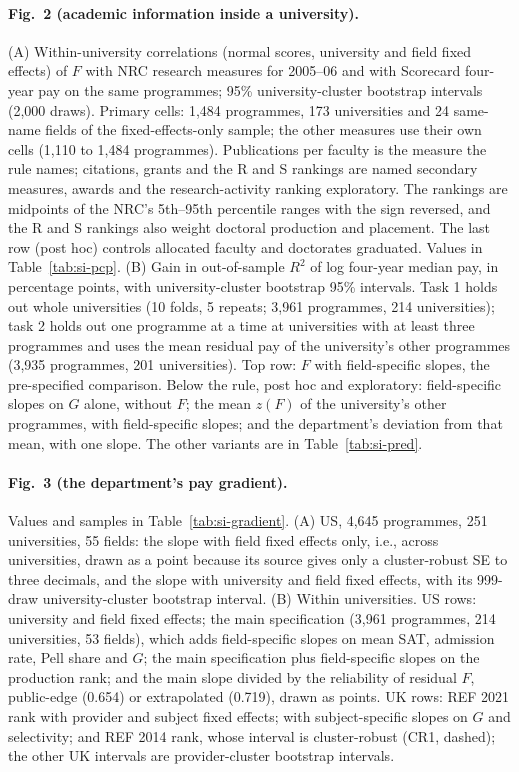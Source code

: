 \documentclass[11pt]{article}
\begin{document}
\paragraph{Fig.~2 (academic information inside a university).} (A) Within-university correlations (normal scores,
university and field fixed effects) of $F$ with NRC research measures for 2005--06 and with Scorecard four-year pay
on the same programmes; 95\% university-cluster bootstrap intervals (2,000 draws). Primary cells: 1,484 programmes,
173 universities and 24 same-name fields of the fixed-effects-only sample; the other measures use their own cells
(1,110 to 1,484 programmes). Publications per faculty is the measure the rule names; citations, grants and the R and S
rankings are named secondary measures, awards and the research-activity ranking exploratory. The rankings are
midpoints of the NRC's 5th--95th percentile ranges with the sign reversed, and the R and S rankings also weight
doctoral production and placement. The last row (post hoc) controls allocated faculty and doctorates graduated.
Values in Table~\ref{tab:si-pcp}. (B) Gain in out-of-sample $R^2$ of log four-year median pay, in percentage points,
with university-cluster bootstrap 95\% intervals. Task 1 holds out whole universities (10 folds, 5 repeats; 3,961
programmes, 214 universities); task 2 holds out one programme at a time at universities with at least three
programmes and uses the mean residual pay of the university's other programmes (3,935 programmes, 201 universities).
Top row: $F$ with field-specific slopes, the pre-specified comparison. Below the rule, post hoc and exploratory:
field-specific slopes on $G$ alone, without $F$; the mean $z(F)$ of the university's other programmes, with
field-specific slopes; and the department's deviation from that mean, with one slope. The other variants are in
Table~\ref{tab:si-pred}.

\paragraph{Fig.~3 (the department's pay gradient).} Values and samples in Table~\ref{tab:si-gradient}. (A) US, 4,645
programmes, 251 universities, 55 fields: the slope with field fixed effects only, i.e., across universities, drawn as
a point because its source gives only a cluster-robust SE to three decimals, and the slope with university and field
fixed effects, with its 999-draw university-cluster bootstrap interval. (B) Within universities. US rows: university
and field fixed effects; the main specification (3,961 programmes, 214 universities, 53 fields), which adds
field-specific slopes on mean SAT, admission rate, Pell share and $G$; the main specification plus field-specific
slopes on the production rank; and the main slope divided by the reliability of residual $F$, public-edge (0.654) or
extrapolated (0.719), drawn as points. UK rows: REF 2021 rank with provider and subject fixed effects; with
subject-specific slopes on $G$ and selectivity; and REF 2014 rank, whose interval is cluster-robust (CR1, dashed); the
other UK intervals are provider-cluster bootstrap intervals.
\end{document}
